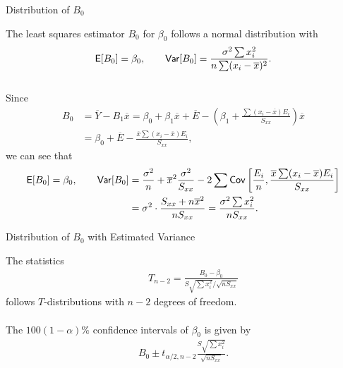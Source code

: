 \begin{frame}{Distribution of $B_0$}

 The least squares estimator $B_0$ for $\beta_0$ follows a normal distribution with
\footnotesize
\begin{align*}
\mathsf{E}[B_0] = \beta_0, \qquad \mathsf{Var}[B_0] = \frac{\sigma^2\sum x_i^2}{n\sum (x_i-\overline{x})^2}.
\end{align*}\\
\normalsize
{} Since
\footnotesize
\begin{align*}
B_0 & = \overline{Y} - B_1\overline{x} = \beta_0 + \beta_1\overline{x} + \overline{E} - \left(\beta_1 + \frac{\sum (x_i-\overline{x})E_i}{S_{xx}} \right) \overline{x} \\
& = \beta_0 + \overline{E} - \frac{\overline{x}\sum (x_i-\overline{x})E_i}{S_{xx}},
\end{align*}
\normalsize
we can see that
\footnotesize
\begin{align*}
\mathsf{E}[B_0] = \beta_0, \qquad \mathsf{Var}[B_0] & = \frac{\sigma^2}{n} + \overline{x}^2 \frac{\sigma^2}{S_{xx}} - 2\sum \mathsf{Cov}\left[\frac{E_i}{n}, \frac{\overline{x} \sum (x_i-\overline{x})E_i}{S_{xx}} \right] \\
& = \sigma^2\cdot \frac{S_{xx} + n\overline{x}^2}{nS_{xx}} = \frac{\sigma^2 \sum x_i^2}{nS_{xx}}.
\end{align*}
\normalsize

\end{frame}

\begin{frame}{Distribution of $B_0$ with Estimated Variance}

\justifying
{} The statistics
\begin{align*}
\qquad T_{n-2} = \frac{B_0-\beta_0}{S\sqrt{\sum x_i^2}/\sqrt{nS_{xx}}}
\end{align*}
follows $T$-distributions with $n-2$ degrees of freedom. \\
~\\
 The $100(1-\alpha)\%$ confidence intervals of $\beta_0$ is given by
\begin{align*}
B_0 \pm t_{\alpha/2,n-2}\frac{S\sqrt{\sum x_i^2}}{\sqrt{nS_{xx}}}.
\end{align*}

\end{frame}


